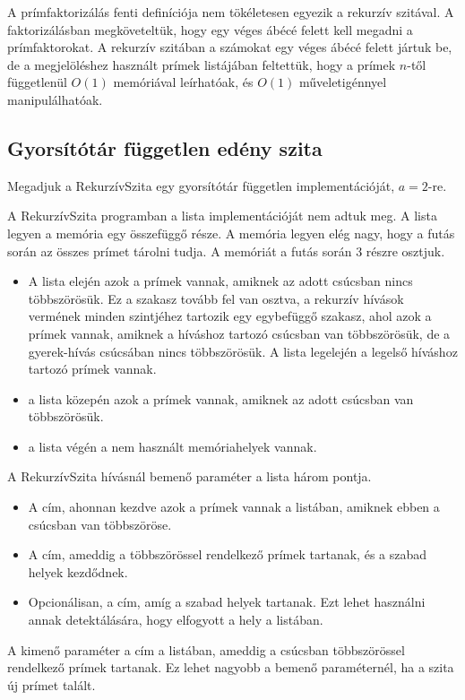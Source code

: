 \documentclass[12pt]{report}
\begin{document}
A prímfaktorizálás fenti definíciója nem tökéletesen egyezik
a rekurzív szitával.
A faktorizálásban megköveteltük, hogy egy véges ábécé felett kell
megadni a prímfaktorokat.
A rekurzív szitában a számokat egy véges ábécé felett jártuk be,
de a megjelöléshez használt prímek listájában feltettük,
hogy a prímek $n$-től függetlenül $O(1)$ memóriával leírhatóak,
és $O(1)$ műveletigénnyel manipulálhatóak.

\subsection{Gyorsítótár független edény szita}

Megadjuk a RekurzívSzita egy gyorsítótár független implementációját, $a=2$-re.

A RekurzívSzita programban a lista implementációját nem adtuk meg.
A lista legyen a memória egy összefüggő része.
A memória legyen elég nagy, hogy a futás során az összes prímet tárolni tudja.
A memóriát a futás során 3 részre osztjuk.
\begin{itemize}
\item A lista elején azok a prímek vannak, amiknek az adott csúcsban nincs többszörösük.
Ez a szakasz tovább fel van osztva,
a rekurzív hívások vermének minden szintjéhez tartozik egy egybefüggő szakasz,
ahol azok a prímek vannak, amiknek a híváshoz tartozó csúcsban van többszörösük,
de a gyerek-hívás csúcsában nincs többszörösük.
A lista legelején a legelső híváshoz tartozó prímek vannak.
\item a lista közepén azok a prímek vannak, amiknek az adott csúcsban van többszörösük.
\item a lista végén a nem használt memóriahelyek vannak.
\end{itemize}

A RekurzívSzita hívásnál bemenő paraméter a lista három pontja.
\begin{itemize}
\item A cím, ahonnan kezdve azok a prímek vannak a listában,
amiknek ebben a csúcsban van többszöröse.
\item A cím, ameddig a többszörössel rendelkező prímek tartanak,
és a szabad helyek kezdődnek.
\item Opcionálisan, a cím, amíg a szabad helyek tartanak.
Ezt lehet használni annak detektálására, hogy elfogyott a hely a listában.
\end{itemize}
A kimenő paraméter a cím a listában, ameddig a csúcsban többszörössel rendelkező prímek
tartanak. Ez lehet nagyobb a bemenő paraméternél, ha a szita új prímet talált.
\end{document}
